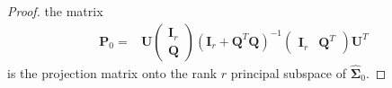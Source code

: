 \documentclass[12pt]{article} %
\newcommand{\bQ}{\mathbf{Q}}
\newcommand{\bP}{\mathbf{P}}
\newcommand{\bI}{\mathbf{I}}
\newcommand{\bU}{\mathbf{U}}
\newcommand{\bfsym}[1]{\ensuremath{\boldsymbol{#1}}}
\def\bSigma {\bfsym {\Sigma}}
\theoremstyle{definition}
\begin{document}
\begin{appendices}
\begin{proof}
    the matrix
    \begin{equation*}
        \begin{split}
        \bP_0
        =&
    \bU
    \begin{pmatrix}
       \bI_r \\
       \bQ
    \end{pmatrix}
    \left(
        \bI_r+\bQ^T \bQ
    \right)^{-1}
    \begin{pmatrix}
        \bI_r
          &
          \bQ^T
        \end{pmatrix}
        \bU^T
        \end{split}
    \end{equation*}
    is the projection matrix onto the rank $r$ principal subspace of $\hat{\bSigma}_0$.


\end{proof}
\end{appendices}
\end{document}
